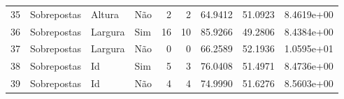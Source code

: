 \begin{tabular}{rlllrrrrr}
35 & Sobrepostas & Altura    & Não         & 2        & 2       & 64.9412      & 51.0923  & 8.4619e+00 \\
36 & Sobrepostas & Largura   & Sim         & 16       & 10      & 85.9266      & 49.2806  & 8.4384e+00 \\
37 & Sobrepostas & Largura   & Não         & 0        & 0       & 66.2589      & 52.1936  & 1.0595e+01 \\
38 & Sobrepostas & Id        & Sim         & 5        & 3       & 76.0408      & 51.4971  & 8.4736e+00 \\
39 & Sobrepostas & Id        & Não         & 4        & 4       & 74.9990      & 51.6276  & 8.5603e+00 \\
\hline
\end{tabular}